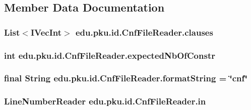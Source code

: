 \subsection{Member Data Documentation}
\hypertarget{classedu_1_1pku_1_1id_1_1_cnf_file_reader_aaa77e88b70b069ecc674f336d7875267}{
\subsubsection[{clauses}]{\setlength{\rightskip}{0pt plus 5cm}List$<$IVecInt$>$ {\bf edu.pku.id.CnfFileReader.clauses}}}
\label{classedu_1_1pku_1_1id_1_1_cnf_file_reader_aaa77e88b70b069ecc674f336d7875267}
\hypertarget{classedu_1_1pku_1_1id_1_1_cnf_file_reader_ad3ed686a592eb84bf6867f7ddd56bd78}{
\subsubsection[{expectedNbOfConstr}]{\setlength{\rightskip}{0pt plus 5cm}int {\bf edu.pku.id.CnfFileReader.expectedNbOfConstr}}}
\label{classedu_1_1pku_1_1id_1_1_cnf_file_reader_ad3ed686a592eb84bf6867f7ddd56bd78}
\hypertarget{classedu_1_1pku_1_1id_1_1_cnf_file_reader_a2d67af544ebc5ae1e787e00a8104b675}{
\subsubsection[{formatString}]{\setlength{\rightskip}{0pt plus 5cm}final String {\bf edu.pku.id.CnfFileReader.formatString} = \char`\"{}cnf\char`\"{}}}
\label{classedu_1_1pku_1_1id_1_1_cnf_file_reader_a2d67af544ebc5ae1e787e00a8104b675}
\hypertarget{classedu_1_1pku_1_1id_1_1_cnf_file_reader_a3717ac54164ef0dfbecbae92b1aa72a1}{
\subsubsection[{in}]{\setlength{\rightskip}{0pt plus 5cm}LineNumberReader {\bf edu.pku.id.CnfFileReader.in}}}

